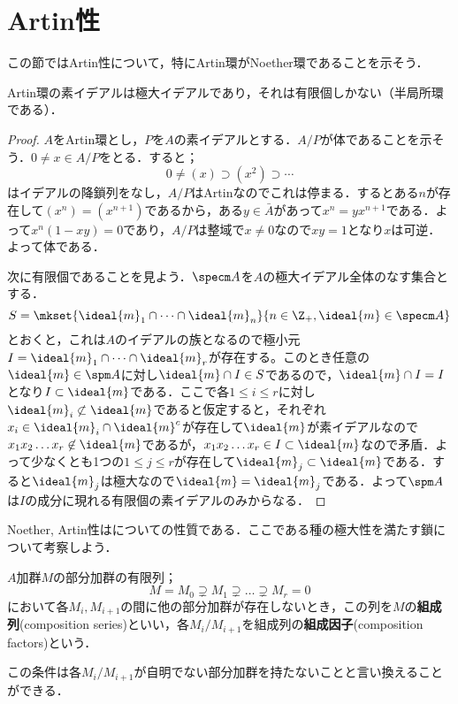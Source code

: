 \section{Artin性}

この節ではArtin性について，特にArtin環がNoether環であることを示そう．
\begin{prop}\label{prop:Artinの素イデアル}
	Artin環の素イデアルは極大イデアルであり，それは有限個しかない（半局所環である）．
\end{prop}
\begin{proof}
	$A$をArtin環とし，$P$を$A$の素イデアルとする．$A/P$が体であることを示そう．$0\neq x\in A/P$をとる．すると；
	\[0\neq(x)\supset(x^2)\supset\cdots\]
	はイデアルの降鎖列をなし，$A/P$はArtinなのでこれは停まる．するとある$n$が存在して$(x^n)=(x^{n+1})$であるから，ある$y\in\bar{A}$があって$x^n=yx^{n+1}$である．よって$x^n(1-xy)=0$であり，$A/P$は整域で$x\neq0$なので$xy=1$となり$x$は可逆．よって体である．
	
	次に有限個であることを見よう．$\specm A$を$A$の極大イデアル全体のなす集合とする．
	\[S=\mkset{\ideal{m}_1\cap\dots\cap\ideal{m}_n}{n\in\Z_+,\ideal{m}\in\specm A}\]
	とおくと，これは$A$のイデアルの族となるので極小元$I=\ideal{m}_1\cap\dots\cap\ideal{m}_r$が存在する。このとき任意の$\ideal{m}\in\spm A$に対し$\ideal{m}\cap I\in S$であるので，$\ideal{m}\cap I=I$となり$I\subset\ideal{m}$である．ここで各$1\leq i\leq r$に対し$\ideal{m}_i\not\subset\ideal{m}$であると仮定すると，それぞれ$x_i\in\ideal{m}_i\cap\ideal{m}^c$が存在して$\ideal{m}$が素イデアルなので$x_1x_2\dots x_r\not\in\ideal{m}$であるが，$x_1x_2\dots x_r\in I\subset\ideal{m}$なので矛盾．よって少なくとも1つの$1\leq j\leq r$が存在して$\ideal{m}_j\subset\ideal{m}$である．すると$\ideal{m}_j$は極大なので$\ideal{m}=\ideal{m}_j$である．よって$\spm A$は$I$の成分に現れる有限個の素イデアルのみからなる．
\end{proof}

Noether, Artin性はについての性質である．ここである種の極大性を満たす鎖について考察しよう．

\begin{defi}[組成列]
	$A$加群$M$の部分加群の有限列；
	\[M=M_0\supsetneq M_1\supsetneq\dots\supsetneq M_r=0\]
	において各$M_i,M_{i+1}$の間に他の部分加群が存在しないとき，この列を$M$の\textbf{組成列}(composition series)といい，各$M_i/M_{i+1}$を組成列の\textbf{組成因子}(composition factors)という．
\end{defi}

この条件は各$M_i/M_{i+1}$が自明でない部分加群を持たないことと言い換えることができる．

